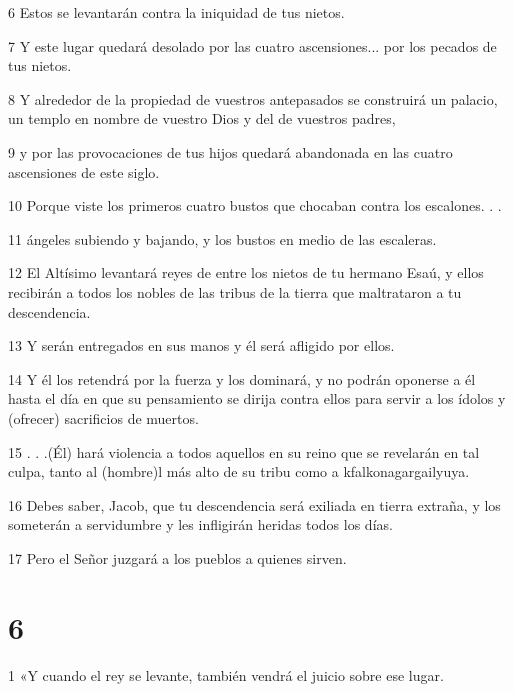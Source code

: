 \par 6 Estos se levantarán contra la iniquidad de tus nietos.

\par 7 Y este lugar quedará desolado por las cuatro ascensiones... por los pecados de tus nietos.

\par 8 Y alrededor de la propiedad de vuestros antepasados ​​se construirá un palacio, un templo en nombre de vuestro Dios y del de vuestros padres,

\par 9 y por las provocaciones de tus hijos quedará abandonada en las cuatro ascensiones de este siglo.

\par 10 Porque viste los primeros cuatro bustos que chocaban contra los escalones. . .

\par 11 ángeles subiendo y bajando, y los bustos en medio de las escaleras.

\par 12 El Altísimo levantará reyes de entre los nietos de tu hermano Esaú, y ellos recibirán a todos los nobles de las tribus de la tierra que maltrataron a tu descendencia.

\par 13 Y serán entregados en sus manos y él será afligido por ellos.

\par 14 Y él los retendrá por la fuerza y ​​los dominará, y no podrán oponerse a él hasta el día en que su pensamiento se dirija contra ellos para servir a los ídolos y (ofrecer) sacrificios de muertos.

\par 15 . . .(Él) hará violencia a todos aquellos en su reino que se revelarán en tal culpa, tanto al (hombre)l más alto de su tribu como a kfalkonagargailyuya.

\par 16 Debes saber, Jacob, que tu descendencia será exiliada en tierra extraña, y los someterán a servidumbre y les infligirán heridas todos los días.

\par 17 Pero el Señor juzgará a los pueblos a quienes sirven.

\chapter{6}

\par 1 «Y cuando el rey se levante, también vendrá el juicio sobre ese lugar.


